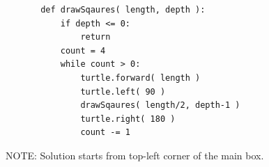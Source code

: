     \begin{answer}

\vspace{-28pt}

    \begin{lstlisting}
       def drawSqaures( length, depth ):
           if depth <= 0:
               return
           count = 4
           while count > 0:
               turtle.forward( length )
               turtle.left( 90 )
               drawSqaures( length/2, depth-1 )
               turtle.right( 180 )
               count -= 1
      \end{lstlisting}
        NOTE: Solution starts from top-left corner of the main box.
     \end{answer}
